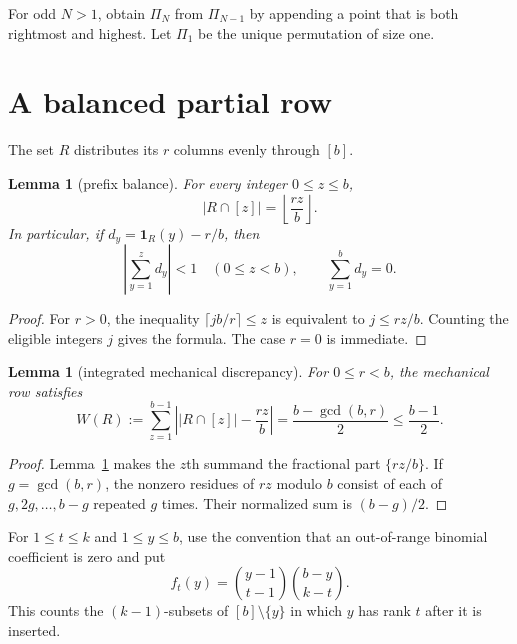 \documentclass[11pt,letterpaper]{article}
\newtheorem{lemma}[theorem]{Lemma}
\begin{document}
For odd $N>1$, obtain $\Pi_N$ from $\Pi_{N-1}$ by appending a point that
is both rightmost and highest.  Let $\Pi_1$ be the unique permutation of
size one.

\section{A balanced partial row}

The set $R$ distributes its $r$ columns evenly through $[b]$.

\begin{lemma}[prefix balance]\label{lem:prefix}
For every integer $0\leq z\leq b$,
\[
 |R\cap[z]|=\left\lfloor\frac{rz}{b}\right\rfloor.
\]
In particular, if $d_y=\mathbf1_R(y)-r/b$, then
\[
 \left|\sum_{y=1}^z d_y\right|<1
 \quad (0\leq z<b),
 \qquad
 \sum_{y=1}^b d_y=0.
\]
\end{lemma}

\begin{proof}
For $r>0$, the inequality $\lceil jb/r\rceil\leq z$ is equivalent to
$j\leq rz/b$.  Counting the eligible integers $j$ gives the formula.
The case $r=0$ is immediate.
\end{proof}

\begin{lemma}[integrated mechanical discrepancy]\label{lem:mechanical-earthmover}
For $0\leq r<b$, the mechanical row satisfies
\[
 W(R):=\sum_{z=1}^{b-1}
 \left||R\cap[z]|-\frac{rz}{b}\right|
 =\frac{b-\gcd(b,r)}2\leq\frac{b-1}2.
\]
\end{lemma}

\begin{proof}
Lemma~\ref{lem:prefix} makes the $z$th summand the fractional part
$\{rz/b\}$.  If $g=\gcd(b,r)$, the nonzero residues of $rz$ modulo $b$
consist of each of $g,2g,\ldots,b-g$ repeated $g$ times.  Their normalized
sum is $(b-g)/2$.
\end{proof}

For $1\leq t\leq k$ and $1\leq y\leq b$, use the convention that an
out-of-range binomial coefficient is zero and put
\[
 f_t(y)=\binom{y-1}{t-1}\binom{b-y}{k-t}.
\]
This counts the $(k-1)$-subsets of $[b]\setminus\{y\}$ in which $y$ has
rank $t$ after it is inserted.
\end{document}
